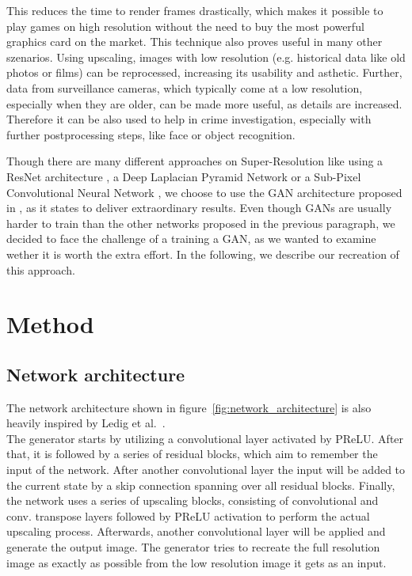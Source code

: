 \documentclass[11pt,twocolumn,twoside,paper=a4]{IEEEtran}
\begin{document}
This reduces the time to render frames drastically, which makes it possible to play games on high resolution without the need to buy the most powerful graphics card on the market. 
This technique also proves useful in many other szenarios.
Using upscaling, images with low resolution (e.g. historical data like old photos or films) can be reprocessed, increasing its usability and asthetic.
Further, data from surveillance cameras, which typically come at a low resolution, especially when they are older, can be made more useful, as details are increased. Therefore it can be also used to help in crime investigation, especially with further postprocessing steps, like face or object recognition.

Though there are many different approaches on Super-Resolution like using a ResNet architecture \cite{lim2017enhanced}, a Deep Laplacian Pyramid Network \cite{lai2018fast} or a Sub-Pixel Convolutional Neural Network \cite{shi2016real}, we choose to use the GAN architecture proposed in \cite{DBLP:journals/corr/LedigTHCATTWS16}, as it states to deliver extraordinary results.
Even though GANs are usually harder to train than the other networks proposed in the previous paragraph, we decided to face the challenge of a training a GAN, as we wanted to examine wether it is worth the extra effort.
In the following, we describe our recreation of this approach.

\section{Method}
\subsection{Network architecture}
The network architecture shown in figure~\ref{fig:network_architecture} is also heavily inspired by Ledig et al.~\cite{DBLP:journals/corr/LedigTHCATTWS16}.\\
The generator starts by utilizing a convolutional layer activated by PReLU. 
After that, it is followed by a series of residual blocks, 
which aim to remember the input of the network. 
After another convolutional layer the input will be added to the current state by a skip connection spanning over all residual blocks. 
Finally, the network uses a series of upscaling blocks, consisting of convolutional and conv. transpose layers followed by PReLU activation to perform the actual upscaling process. 
Afterwards, another convolutional layer will be applied and generate the output image. The generator tries to recreate the full resolution image as exactly as possible from the low resolution image it gets as an input.
\end{document}
